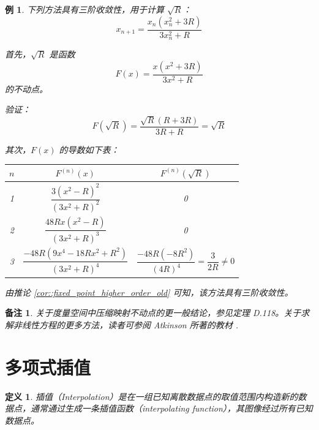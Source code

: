 \documentclass[a4paper]{ctexart}
\newtheorem{remark}{备注}
\newtheorem{definition}[theorem]{定义} %
\newtheorem{example}[theorem]{例}
\numberwithin{theorem}{section}
\numberwithin{equation}{section}
\numberwithin{figure}{section}
\numberwithin{remark}{section}
\begin{document}
\begin{example}
下列方法具有三阶收敛性，用于计算 \( \sqrt{R} \)：
\begin{equation}
x_{n+1} = \frac{x_n (x_n^2 + 3R)}{3x_n^2 + R}
\end{equation}

首先，\( \sqrt{R} \) 是函数
\begin{equation}
F(x) = \frac{x(x^2 + 3R)}{3x^2 + R}
\end{equation}
的不动点。

验证：
\begin{equation}
F(\sqrt{R}) = \frac{\sqrt{R}(R + 3R)}{3R + R} = \sqrt{R}
\end{equation}

其次，\( F(x) \) 的导数如下表：

\begin{tabular}{@{}c|c|c@{}}
\toprule
\( n \) & \( F^{(n)}(x) \) & \( F^{(n)}(\sqrt{R}) \) \\
\midrule
1 & \( \dfrac{3(x^2 - R)^2}{(3x^2 + R)^2} \) & 0 \\
2 & \( \dfrac{48Rx(x^2 - R)}{(3x^2 + R)^3} \) & 0 \\
3 & \( \dfrac{-48R(9x^4 - 18Rx^2 + R^2)}{(3x^2 + R)^4} \) & \( \dfrac{-48R(-8R^2)}{(4R)^4} = \dfrac{3}{2R} \ne 0 \) \\
\bottomrule
\end{tabular}

由推论 \ref{cor::fixed_point_higher_order_old} 可知，该方法具有三阶收敛性。
\end{example}

\begin{remark}
关于度量空间中压缩映射不动点的更一般结论，参见定理 D.118。关于求解非线性方程的更多方法，读者可参阅 Atkinson 所著的教材 \cite[第二章]{Atkinson1989Introduction}.
\end{remark}

\section{多项式插值}
\label{sec::polynomial_interpolation}

\begin{definition}
    插值（Interpolation）是在一组已知离散数据点的取值范围内构造新的数据点，通常通过生成一条插值函数（interpolating function），其图像经过所有已知数据点。
\end{definition}
\end{document}
